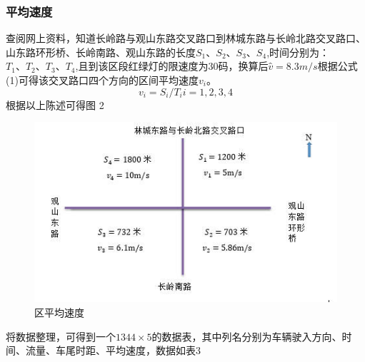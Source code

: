 \documentclass[UTF8]{article}
\begin{document}
    \subsubsection{平均速度}
    查阅网上资料，知道长岭路与观山东路交叉路口到林城东路与长岭北路交叉路口、山东路环形桥、长岭南路、观山东路的长度$S_1、S_2、S_3、S_4$,时间分别为：$T_1、T_2、T_3、T_4$,且到该区段红绿灯的限速度为30码，换算后$ v ̂=8.3m/s$根据公式(1)可得该交叉路口四个方向的区间平均速度$v_i$。
        \begin{equation}
            v_i=S_i/T_i                i=1,2,3,4	
        \end{equation}	
        根据以上陈述可得图 2\\
    \begin{figure}[H]
        \includegraphics[width= \linewidth]{2.jpg}
        \caption{区平均速度}
    \end{figure}
    将数据整理，可得到一个$1344×5$的数据表，其中列名分别为车辆驶入方向、时间、流量、车尾时距、平均速度，数据如表3\\
\end{document}
